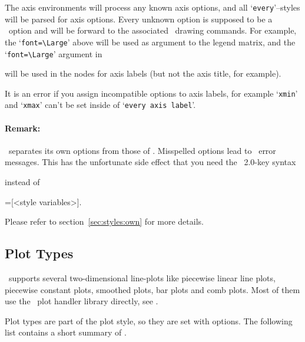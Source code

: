 The axis environments will process any known axis options, and all `\texttt{every}'--styles will be parsed for axis options. Every unknown option is supposed to be a \Tikz\ option and will be forward to the associated \Tikz\ drawing commands. For example, the `\lstinline{font=\Large}' above will be used as argument to the legend matrix, and the `\lstinline{font=\Large}' argument in 
\begin{codeexample}[code only]
+=[
	ylabel=Error,xlabel=Dof,font=\Large}
\end{codeexample}
will be used in the nodes for axis labels (but not the axis title, for example).

It is an error if you assign incompatible options to axis labels, for example `\texttt{xmin}' and `\texttt{xmax}' can't be set inside of `\texttt{every axis label}'.

\paragraph{Remark:} \PGFPlots\ separates its own options from those of \Tikz. Misspelled options lead to \Tikz\ error messages. This has the unfortunate side effect that you need the \PGF\ 2.0-key syntax
\begin{codeexample}
\end{codeexample}
instead of
\begin{codeexample}
=[<style variables>].
\end{codeexample}
Please refer to section~\ref{sec:styles:own} for more details.



\subsection{Plot Types}
\PGFPlots\ supports several two-dimensional line-plots like piecewise linear line plots, piecewise constant plots, smoothed plots, bar plots and comb plots. Most of them use the \PGF\ plot handler library directly, see \cite[section 18.8]{tikz}.

Plot types are part of the plot style, so they are set with options. The following list contains a short summary of \cite[section 18.8]{tikz}.


